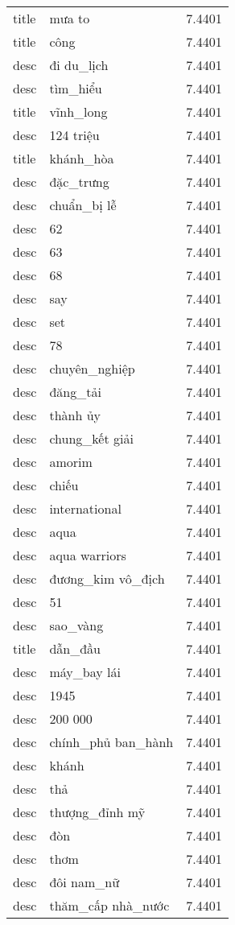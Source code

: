 \documentclass{article}
\begin{document}
\begin{tabular}{lll}
title & mưa to & 7.4401\\
title & công & 7.4401\\
desc & đi du\_lịch & 7.4401\\
desc & tìm\_hiểu & 7.4401\\
title & vĩnh\_long & 7.4401\\
desc & 124 triệu & 7.4401\\
title & khánh\_hòa & 7.4401\\
desc & đặc\_trưng & 7.4401\\
desc & chuẩn\_bị lễ & 7.4401\\
desc & 62 & 7.4401\\
desc & 63 & 7.4401\\
desc & 68 & 7.4401\\
desc & say & 7.4401\\
desc & set & 7.4401\\
desc & 78 & 7.4401\\
desc & chuyên\_nghiệp & 7.4401\\
desc & đăng\_tải & 7.4401\\
desc & thành ủy & 7.4401\\
desc & chung\_kết giải & 7.4401\\
desc & amorim & 7.4401\\
desc & chiếu & 7.4401\\
desc & international & 7.4401\\
desc & aqua & 7.4401\\
desc & aqua warriors & 7.4401\\
desc & đương\_kim vô\_địch & 7.4401\\
desc & 51 & 7.4401\\
desc & sao\_vàng & 7.4401\\
title & dẫn\_đầu & 7.4401\\
desc & máy\_bay lái & 7.4401\\
desc & 1945 & 7.4401\\
desc & 200 000 & 7.4401\\
desc & chính\_phủ ban\_hành & 7.4401\\
desc & khánh & 7.4401\\
desc & thả & 7.4401\\
desc & thượng\_đỉnh mỹ & 7.4401\\
desc & đòn & 7.4401\\
desc & thơm & 7.4401\\
desc & đôi nam\_nữ & 7.4401\\
desc & thăm\_cấp nhà\_nước & 7.4401\\

\end{tabular}
\end{document}
